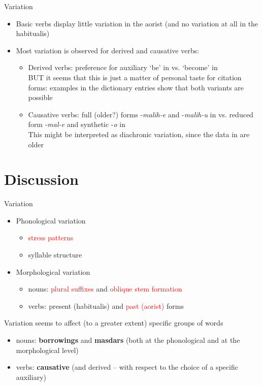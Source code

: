 \begin{frame}{Variation}
\begin{itemize}
    \item Basic verbs display little variation in the aorist (and no variation at all in the habitualis)
    \item Most variation is observed for derived and causative verbs:
    \begin{itemize}
        \item Derived verbs: preference for auxiliary `be' in \citet{saidovaabusov2012} vs. `become' in \citet{alekseev2019} \\ BUT it seems that this is just a matter of personal taste for citation forms: examples in the dictionary entries show that both variants are possible
        \item Causative verbs: full (older?) forms -\textit{malih-e} and -\textit{malih-u} in \citet{alekseev2019} vs. reduced form -\textit{mal-e} and synthetic -\textit{o} in \citet{saidovaabusov2012} \\ This might be interpreted as diachronic variation, since the data in \citet{alekseev2019} are older
    \end{itemize}
\end{itemize}
\end{frame}

\section{Discussion}
\begin{frame}{Variation}
\begin{itemize}
    \item Phonological variation
    \begin{itemize}
        \item \textcolor{red}{stress patterns}
        \item syllable structure
    \end{itemize}
    \item Morphological variation
    \begin{itemize}
        \item nouns: \textcolor{red}{plural suffixes} and \textcolor{red}{oblique stem formation}
        \item verbs: present (habitualis) and \textcolor{red}{past (aorist)} forms 
    \end{itemize}
\end{itemize}
Variation seems to affect (to a greater extent) specific groups of words
\begin{itemize}
    \item nouns: \textbf{borrowings} and \textbf{masdars} (both at the phonological and at the morphological level)
    \item verbs: \textbf{causative} (and derived -- with respect to the choice of a specific auxiliary)
\end{itemize}
\end{frame}

